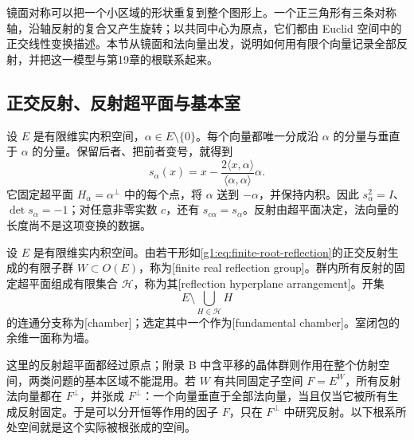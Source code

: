 镜面对称可以把一个小区域的形状重复到整个图形上。一个正三角形有三条对称轴，沿轴反射的复合又产生旋转；以共同中心为原点，它们都由 Euclid 空间中的正交线性变换描述。本节从镜面和法向量出发，说明如何用有限个向量记录全部反射，并把这一模型与第19章的根联系起来。

\subsection{正交反射、反射超平面与基本室}
\label{g1:subsec:E01:01}

设 \(E\) 是有限维实内积空间，\(\alpha\in E\setminus\{0\}\)。每个向量都唯一分成沿 \(\alpha\) 的分量与垂直于 \(\alpha\) 的分量。保留后者、把前者变号，就得到
\begin{equation}\label{g1:eq:finite-root-reflection}
	s_\alpha(x)=x-\frac{2\langle x,\alpha\rangle}{\langle\alpha,\alpha\rangle}\alpha.
\end{equation}
它固定超平面 \(H_\alpha=\alpha^\perp\) 中的每个点，将 \(\alpha\) 送到 \(-\alpha\)，并保持内积。因此 \(s_\alpha^2=I\)、\(\det s_\alpha=-1\)；对任意非零实数 \(c\)，还有 \(s_{c\alpha}=s_\alpha\)。反射由超平面决定，法向量的长度尚不是这项变换的数据。

\begin{definition}[有限实反射群]\label{g1:def:finite-real-reflection-group}
	设 \(E\) 是有限维实内积空间。由若干形如\eqref{g1:eq:finite-root-reflection}的正交反射生成的有限子群 \(W\subset O(E)\)，称为[finite real reflection group]。群内所有反射的固定超平面组成有限集合 \(\mathcal H\)，称为其[reflection hyperplane arrangement]。开集
	\[
		E\setminus\bigcup_{H\in\mathcal H}H
	\]
	的连通分支称为[chamber]；选定其中一个作为[fundamental chamber]。室闭包的余维一面称为墙。
\end{definition}

这里的反射超平面都经过原点；附录 B 中含平移的晶体群则作用在整个仿射空间，两类问题的基本区域不能混用。若 \(W\) 有共同固定子空间 \(F=E^W\)，所有反射法向量都在 \(F^\perp\)，并张成 \(F^\perp\)：一个向量垂直于全部法向量，当且仅当它被所有生成反射固定。于是可以分开恒等作用的因子 \(F\)，只在 \(F^\perp\) 中研究反射。以下根系所处空间就是这个实际被根张成的空间。

